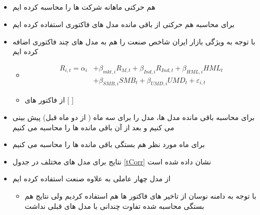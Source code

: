 \subsection{}
\label{comovement}
\begin{itemize}
	\item
	هم حرکتی ماهانه شرکت ها را محاسبه کرده ایم
	\item
	برای محاسبه هم حرکتی از باقی مانده مدل های فاکتوری استفاده کرده ایم
	\item
	با توجه به ویژگی بازار ایران شاخص صنعت را هم به مدل های چند فاکتوری اضافه کرده ایم

\begin{itemize}
	\item 
		\begin{equation}
		\begin{split}
			R_{i,t} =\alpha _{i}&+\beta _{mkt,i}{\mathit {R}}_{M,t} + \beta_{Ind,i}{\mathit {R}}_{Ind,t}+\beta _{HML,i}{\mathit {HML}}_{t} \\
			&+\beta _{SMB,i}{\mathit {SMB}}_{t}+\beta _{UMD,i}{\mathit {UMD}}_{t}+ \varepsilon_{i,t}
		\end{split}
		\label{e5Factor}
	\end{equation}
	\item
	از فاکتور های  [
	]
\end{itemize}
	
	\item
	برای محاسبه باقی مانده مدل ها، مدل را برای سه ماه ( از دو ماه قبل) پیش بینی می کنیم و بعد از آن باقی مانده ها را محاسبه می کنیم
	\item
	برای ماه مورد نظر هم بستگی باقی مانده ها را محاسبه می کنیم
	\item
	نتایج برای مدل های مختلف  در جدول
	\ref{tCorr}
	نشان داده شده است
	\item
	از مدل چهار عاملی به علاوه صنعت استفاده کرده ایم
	\begin{itemize}
		\item 
		با توجه به دامنه نوسان از تاخیر های فاکتور ها هم استفاده کردیم ولی نتایج  هم بستگی محاسبه شده تفاوت چندانی با مدل های قبلی نداشت
	\end{itemize}
	
\end{itemize}

     
\begin{LTR}
\end{LTR}
      

